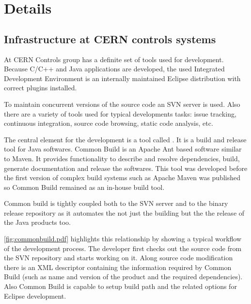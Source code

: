 \chapter{Details}


\section{Infrastructure at CERN controls systems}

At CERN Controls group has a definite set of tools used for development. Because
C/C++ and Java applications are developed, the used Integrated Development
Environment is an internally maintained Eclipse distribution with correct
plugins installed.

To maintain concurrent versions of the source code an SVN server is used. Also
there are a variety of tools used for typical developments tasks: issue
tracking, continuous integration, source code browsing, static code analysis,
etc. 

The central element for the development is a tool called 
\cite{CommonBuild}. It is a build and release tool for Java softwares. Common
Build is an Apache Ant based software similar to Maven. It provides
functionality to describe and resolve dependencies, build, generate
documentation and release the softwares. This tool was developed before the
first version of complex build systems such as Apache Maven was published so 
Common Build remained as an in-house build tool. 

Common build is tightly coupled both to the SVN server and to the binary release
repository as it automates the not just the building but the the release of the
Java products too.

\autoref{fig:commonbuild.pdf} highlights this relationship by showing a typical
workflow of the development process. The developer first checks out the source
code from the SVN repository and starts working on it. Along source code
modification there is an XML descriptor containing the information required by
Common Build (such as name and version of the product and the required
dependencies). Also Common Build is capable to setup build path and the related
options for Eclipse development. 

